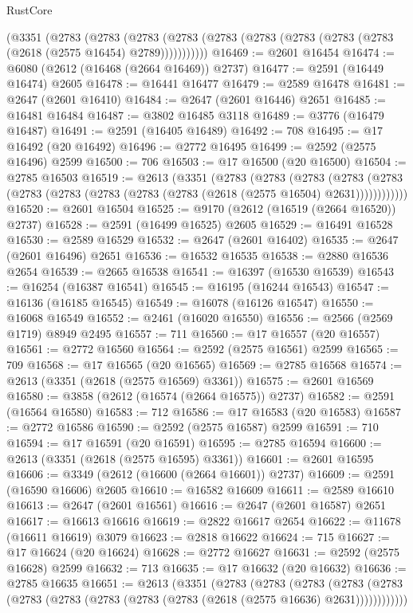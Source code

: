 \begin{lexlean}{RustCore}
\begin{coremodule}
    (@3351
      (@2783
        (@2783
          (@2783 (@2783 (@2783 (@2783 (@2783 (@2783 (@2783 (@2618 (@2575 @16454) @2789)))))))))))
@16469 := @2601 @16454
@16474 := @6080 (@2612 (@16468 (@2664 @16469)) @2737)
@16477 := @2591 (@16449 @16474) @2605
@16478 := @16441 @16477
@16479 := @2589 @16478
@16481 := @2647 (@2601 @16410)
@16484 := @2647 (@2601 @16446) @2651
@16485 := @16481 @16484
@16487 := @3802 @16485 @3118
@16489 := @3776 (@16479 @16487)
@16491 := @2591 (@16405 @16489)
@16492 := 708
@16495 := @17 @16492 (@20 @16492)
@16496 := @2772 @16495
@16499 := @2592 (@2575 @16496) @2599
@16500 := 706
@16503 := @17 @16500 (@20 @16500)
@16504 := @2785 @16503
@16519 := @2613
    (@3351
      (@2783
        (@2783
          (@2783
            (@2783 (@2783 (@2783 (@2783 (@2783 (@2783 (@2783 (@2618 (@2575 @16504) @2631))))))))))))
@16520 := @2601 @16504
@16525 := @9170 (@2612 (@16519 (@2664 @16520)) @2737)
@16528 := @2591 (@16499 @16525) @2605
@16529 := @16491 @16528
@16530 := @2589 @16529
@16532 := @2647 (@2601 @16402)
@16535 := @2647 (@2601 @16496) @2651
@16536 := @16532 @16535
@16538 := @2880 @16536 @2654
@16539 := @2665 @16538
@16541 := @16397 (@16530 @16539)
@16543 := @16254 (@16387 @16541)
@16545 := @16195 (@16244 @16543)
@16547 := @16136 (@16185 @16545)
@16549 := @16078 (@16126 @16547)
@16550 := @16068 @16549
@16552 := @2461 (@16020 @16550)
@16556 := @2566 (@2569 @1719) @8949 @2495
@16557 := 711
@16560 := @17 @16557 (@20 @16557)
@16561 := @2772 @16560
@16564 := @2592 (@2575 @16561) @2599
@16565 := 709
@16568 := @17 @16565 (@20 @16565)
@16569 := @2785 @16568
@16574 := @2613 (@3351 (@2618 (@2575 @16569) @3361))
@16575 := @2601 @16569
@16580 := @3858 (@2612 (@16574 (@2664 @16575)) @2737)
@16582 := @2591 (@16564 @16580)
@16583 := 712
@16586 := @17 @16583 (@20 @16583)
@16587 := @2772 @16586
@16590 := @2592 (@2575 @16587) @2599
@16591 := 710
@16594 := @17 @16591 (@20 @16591)
@16595 := @2785 @16594
@16600 := @2613 (@3351 (@2618 (@2575 @16595) @3361))
@16601 := @2601 @16595
@16606 := @3349 (@2612 (@16600 (@2664 @16601)) @2737)
@16609 := @2591 (@16590 @16606) @2605
@16610 := @16582 @16609
@16611 := @2589 @16610
@16613 := @2647 (@2601 @16561)
@16616 := @2647 (@2601 @16587) @2651
@16617 := @16613 @16616
@16619 := @2822 @16617 @2654
@16622 := @11678 (@16611 @16619) @3079
@16623 := @2818 @16622
@16624 := 715
@16627 := @17 @16624 (@20 @16624)
@16628 := @2772 @16627
@16631 := @2592 (@2575 @16628) @2599
@16632 := 713
@16635 := @17 @16632 (@20 @16632)
@16636 := @2785 @16635
@16651 := @2613
    (@3351
      (@2783
        (@2783
          (@2783
            (@2783 (@2783 (@2783 (@2783 (@2783 (@2783 (@2783 (@2618 (@2575 @16636) @2631))))))))))))

\end{coremodule}
\end{lexlean}
